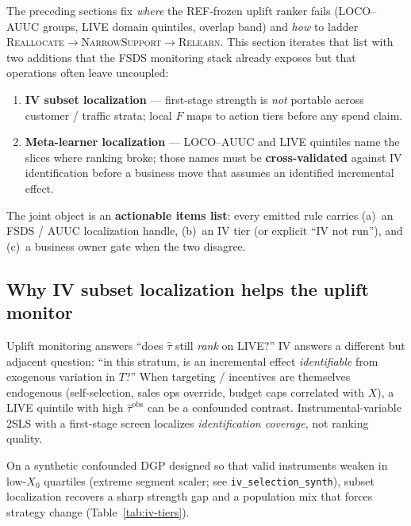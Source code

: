 \documentclass{article}
\begin{document}
The preceding sections fix \emph{where} the REF-frozen uplift ranker fails
(LOCO--AUUC groups, LIVE domain quintiles, overlap band) and \emph{how} to
ladder \textsc{Reallocate}$\to$\textsc{NarrowSupport}$\to$\textsc{Relearn}.
This section iterates that list with two additions that the FSDS monitoring
stack already exposes but that operations often leave uncoupled:
\begin{enumerate}\itemsep2pt
  \item \textbf{IV subset localization} --- first-stage strength is
        \emph{not} portable across customer / traffic strata; local $F$
        maps to action tiers before any spend claim.
  \item \textbf{Meta-learner localization} --- LOCO--AUUC and LIVE
        quintiles name the slices where ranking broke; those names must be
        \textbf{cross-validated} against IV identification before a
        business move that assumes an identified incremental effect.
\end{enumerate}
The joint object is an \textbf{actionable items list}: every emitted rule
carries (a)~an FSDS / AUUC localization handle, (b)~an IV tier (or
explicit ``IV not run''), and (c)~a business owner gate when the two
disagree.

\subsection{Why IV subset localization helps the uplift monitor}
\label{sec:iv-helps-monitor}

Uplift monitoring answers ``does $\hat\tau$ still \emph{rank} on LIVE?''
IV answers a different but adjacent question: ``in this stratum, is an
incremental effect \emph{identifiable} from exogenous variation in $T$?''
When targeting / incentives are themselves endogenous (self-selection,
sales ops override, budget caps correlated with $X$), a LIVE quintile with
high $\widehat{\tau}^{\mathrm{obs}}$ can be a confounded contrast.
Instrumental-variable 2SLS with a first-stage screen localizes
\emph{identification coverage}, not ranking quality.

On a synthetic confounded DGP designed so that valid instruments weaken in
low-$X_0$ quartiles (extreme segment scaler; see
\texttt{iv\_selection\_synth}), subset localization recovers a sharp
strength gap and a population mix that forces strategy change
(Table~\ref{tab:iv-tiers}).
\end{document}
